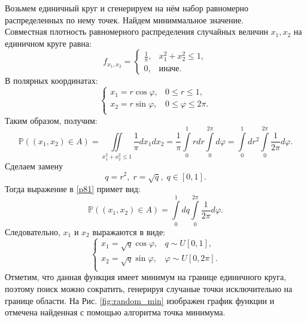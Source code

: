 Возьмем единичный круг и сгенерируем на нём набор равномерно распределенных
 по нему точек. Найдем миниммальное значение.\\
Совместная плотность равномерного распределения случайных величин $ x_1,
 x_2 $ на единичном круге равна:
\begin{equation}
    f_{x_1, x_2} = \begin{cases}
        \frac{1}{\pi}, & x_1^2 + x_2^2 \leq 1,\\
        0, &\text{иначе.}
    \end{cases}
\end{equation}
В полярных координатах:
\begin{equation}
    \left\{
    \begin{array}{lll}
        x_1 = r\cos\varphi, &0 \leqslant r \leqslant 1,\\
        x_2 = r\sin\varphi, &0 \leqslant\varphi\leqslant 2\pi.\\
    \end{array}
    \right.
\end{equation}
Таким образом, получим:
\begin{equation} \label{p81}
    \mathbb{P}((x_1, x_2) \in A) = \iint \limits_{x_1^2 + x_2^2 \leq 1} 
     \frac{1}{\pi} dx_1 dx_2 = \frac{1}{\pi} \int\limits_0^1 r dr 
     \int\limits_0^{2\pi} d\varphi = \int\limits_0^1 dr^2 \int\limits_0^{2\pi}
     \frac{1}{2\pi} d\varphi.
\end{equation}
Сделаем замену
\begin{equation*}
q = r^2,\;r = \sqrt{q},\;q\in[0, 1].
\end{equation*}
Тогда выражение в \eqref{p81} примет вид:
\begin{equation}
\mathbb{P}((x_1, x_2)\in A) = \int\limits_0^1 dq\int\limits_0^{2\pi}
 \frac{1}{2\pi}d\varphi.
\end{equation}
Следовательно, $x_1$ и $x_2$ выражаются в виде:
\begin{equation*}
\left\{
\begin{array}{lll}
x_1 = \sqrt{q}\cos\varphi, &q\sim U[0, 1],\\
x_2 = \sqrt{q}\sin\varphi, &\varphi\sim U[0, 2\pi].\\
\end{array}
\right.
\end{equation*}
Отметим, что данная функция имеет минимум на границе единичного круга,
 поэтому поиск можно сократить, генерируя случаные точки исключительно
 на границе области. На Рис. \eqref{fig:random_min} изображен график функции
 и отмечена найденная с помощью алгоритма точка минимума.

